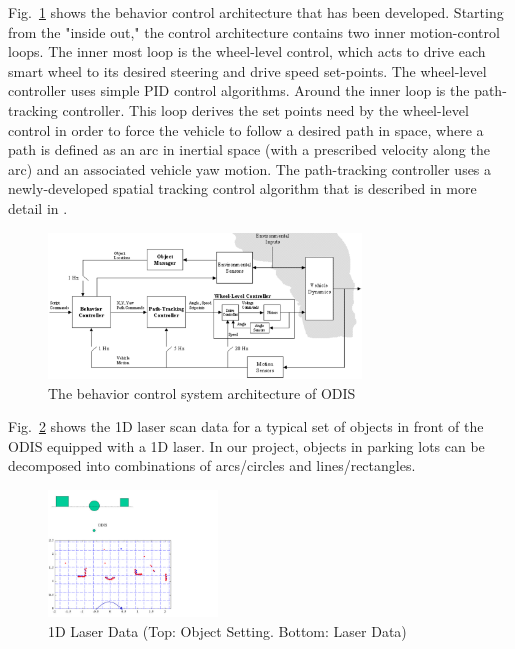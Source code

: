 \documentclass{cdcarta4}
\begin{document}
Fig.~\ref{odis1blk} shows the behavior control architecture that has been developed. 
Starting from the "inside out," the control architecture contains two inner motion-control loops. The inner most loop is the wheel-level control, which acts to drive each smart wheel to its desired steering and drive speed set-points. The wheel-level controller uses simple PID control algorithms. Around the inner loop is the path-tracking controller. This loop derives the set points need by the wheel-level control in order to force the vehicle to follow a desired path in space, where a path is defined as an arc in inertial space (with a prescribed velocity along the arc) and an  associated vehicle yaw motion. The path-tracking controller 
uses a newly-developed spatial tracking control algorithm that is described in more detail in  \cite{odis_icra01}. 

\begin{figure}[!htb]
\center
\includegraphics[width=8.3cm]{img/odis1blk}
\caption{The behavior control system architecture of ODIS} 
\label{odis1blk}
\end{figure} 

Fig.~\ref{fig:1dlaser} shows the 1D laser scan data for a typical set of objects in front of the ODIS equipped with a 1D laser. In our project, objects in parking lots can be  decomposed into  combinations of  arcs/circles and lines/rectangles. 
\begin{figure}[!htb]
    \center\includegraphics[width=0.4\textwidth]{img/1Dlaser}
    \caption{1D Laser Data (Top: Object Setting.  Bottom: Laser Data)}
\label{fig:1dlaser}
\end{figure}
\end{document}

